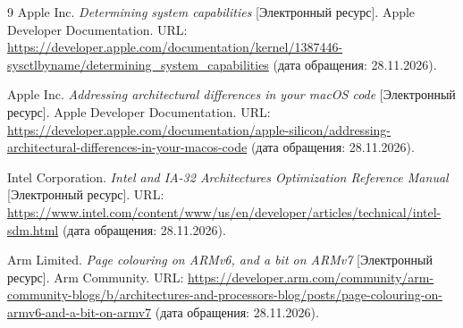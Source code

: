 \newpage
{}

\begin{thebibliography}{9}
Apple Inc. \textit{Determining system capabilities} [Электронный ресурс]. Apple Developer Documentation. URL: \url{https://developer.apple.com/documentation/kernel/1387446-sysctlbyname/determining_system_capabilities} (дата обращения: 28.11.2026).

Apple Inc. \textit{Addressing architectural differences in your macOS code} [Электронный ресурс]. Apple Developer Documentation. URL: \url{https://developer.apple.com/documentation/apple-silicon/addressing-architectural-differences-in-your-macos-code} (дата обращения: 28.11.2026).

Intel Corporation. \textit{Intel and IA-32 Architectures Optimization Reference Manual} [Электронный ресурс]. URL: \url{https://www.intel.com/content/www/us/en/developer/articles/technical/intel-sdm.html} (дата обращения: 28.11.2026).

Arm Limited. \textit{Page colouring on ARMv6, and a bit on ARMv7} [Электронный ресурс]. Arm Community. URL: \url{https://developer.arm.com/community/arm-community-blogs/b/architectures-and-processors-blog/posts/page-colouring-on-armv6-and-a-bit-on-armv7} (дата обращения: 28.11.2026).
\end{thebibliography}
